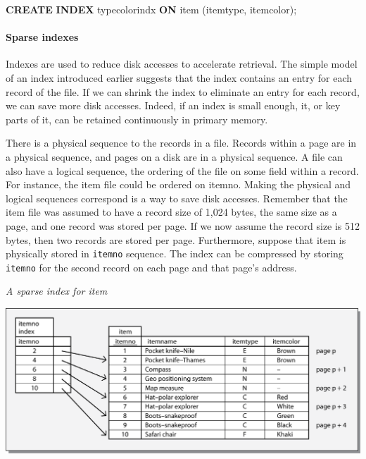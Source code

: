 \documentclass[
]{article}
\newenvironment{Shaded}{\begin{snugshade}}{\end{snugshade}}
\newcommand{\KeywordTok}[1]{\textcolor[rgb]{0.13,0.29,0.53}{\textbf{#1}}}
\newcommand{\NormalTok}[1]{#1}
\begin{document}
\begin{Shaded}
\begin{Highlighting}[]
\KeywordTok{CREATE} \KeywordTok{INDEX}\NormalTok{ typecolorindx }\KeywordTok{ON}\NormalTok{ item (itemtype, itemcolor);}
\end{Highlighting}
\end{Shaded}

\hypertarget{sparse-indexes}{%
\paragraph*{Sparse indexes}\label{sparse-indexes}}

Indexes are used to reduce disk accesses to accelerate retrieval. The
simple model of an index introduced earlier suggests that the index
contains an entry for each record of the file. If we can shrink the
index to eliminate an entry for each record, we can save more disk
accesses. Indeed, if an index is small enough, it, or key parts of it,
can be retained continuously in primary memory.

There is a physical sequence to the records in a file. Records within a
page are in a physical sequence, and pages on a disk are in a physical
sequence. A file can also have a logical sequence, the ordering of the
file on some field within a record. For instance, the item file could be
ordered on itemno. Making the physical and logical sequences correspond
is a way to save disk accesses. Remember that the item file was assumed
to have a record size of 1,024 bytes, the same size as a page, and one
record was stored per page. If we now assume the record size is 512
bytes, then two records are stored per page. Furthermore, suppose that
item is physically stored in \texttt{itemno} sequence. The index can be
compressed by storing \texttt{itemno} for the second record on each page and
that page's address.

\emph{A sparse index for item}

\includegraphics{Figures/Chapter 20/sparse index.png}
\end{document}
